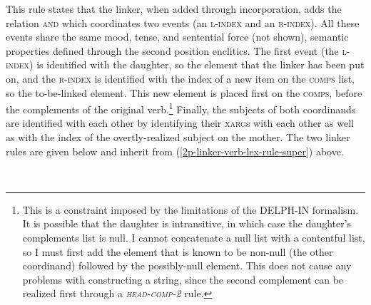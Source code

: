 This rule states that the linker, when added through incorporation, adds the relation \textsc{and} which coordinates two events (an \textsc{l-index} and an \textsc{r-index}). All these events share the same mood, tense, and sentential force (not shown), semantic properties defined through the second position enclitics. The first event (the \textsc{l-index}) is identified with the daughter, so the element that the linker has been put on, and the \textsc{r-index} is identified with the index of a new item on the \textsc{comps} list, so the to-be-linked element. This new element is placed first on the \textsc{comps}, before the complements of the original verb.\footnote{This is a constraint imposed by the limitations of the DELPH-IN formalism. It is possible that the daughter is intransitive, in which case the daughter's complements list is null. I cannot concatenate a null list with a contentful list, so I must first add the element that is known to be non-null (the other coordinand) followed by the possibly-null element. This does not cause any problems with constructing a string, since the second complement can be realized first through a \textsc{\textit{head-comp-2}} rule.} Finally, the subjects of both coordinands are identified with each other by identifying their \textsc{xarg}s with each other as well as with the index of the overtly-realized subject on the mother. The two linker rules are given below and inherit from (\ref{2p-linker-verb-lex-rule-super}) above.

\ex \label{2p-linker-first-lex-rule}
\xe

\ex~ \label{2p-linker-last-lex-rule}
\xe

